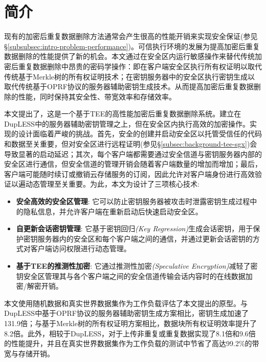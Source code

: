 \section{简介}
\label{sec:sgxdedup-introduction}

现有的加密后重复数据删除方法通常会产生很高的性能开销来实现安全保证(参见\S\ref{subsubsec:intro-problem-performance})。可信执行环境\cite{trustzone,sgx,MK-TME,AMDSEV}的发展为提高加密后重复数据删除的性能提供了新的机会。本文通过在安全区内运行敏感操作来替代传统加密后重复数据删除中昂贵的密码学操作：即在客户端安全区执行所有权证明以取代传统基于Merkle树的所有权证明技术；在密钥服务器中的安全区执行密钥生成以取代传统基于OPRF协议的服务器辅助密钥生成技术。从而提高加密后重复数据删除的性能，同时保持其安全性、带宽效率和存储效率。

本文提出了\sysnameS，这是一个基于TEE的高性能加密后重复数据删除系统。\sysnameS 建立在DupLESS\cite{bellare2013DupLESS}中的服务器辅助密钥管理之上，但在安全区内执行高效的加密操作。实现\sysnameS 的设计面临着严峻的挑战。首先，安全的创建并启动安全区以托管受信任的代码和数据至关重要，但对安全区进行远程证明(参见\S\ref{subsec:background-tee-sgx})会导致显著的启动延迟；其次，每个客户端都需要通过安全信道与密钥服务器内部的安全区进行通信，但安全信道的管理开销会随着客户端数量的增加而增加；最后，客户端可能随时续订或撤销云存储服务的订阅，因此允许对客户端身份进行高效验证以遍动态管理至关重要。为此，本文为\sysnameS 设计了三项核心技术:

\begin{itemize}[leftmargin=0em]
    \item \textbf{安全高效的安全区管理}:
          它可以防止密钥服务器被攻击时泄露密钥生成过程中的隐私信息，并允许客户端在重新启动后快速启动安全区。
    \item \textbf{自更新会话密钥管理}:
          它基于密钥回归\textit{(Key Regression)}\cite{fu06}生成会话密钥，用于保护密钥服务器内的安全区和每个客户端之间的通信，并通过更新会话密钥的方式对客户端访问权限进行动态管理。
    \item \textbf{基于TEE的推测性加密}:
          它通过推测性加密\textit{(Speculative Encryption)}\cite{eduardo2019Speculative}减轻了密钥安全区管理其与各个客户端之间的安全信道传输会话内容时的在线数据加密/解密开销。
\end{itemize}

本文使用随机数据和真实世界数据集\cite{fsl,meyer2011deduplication}作为工作负载评估了本文提出的\sysnameS 原型。与DupLESS\cite{bellare2013DupLESS}中基于OPRF协议的服务器辅助密钥生成方案相比，密钥生成加速了131.9倍；与基于Merkle树的所有权证明方案\cite{halevi11}相比，数据块所有权证明效率提升了8.2倍。此外，相较于DupLESS\cite{bellare2013DupLESS}，\sysnameS 对于上传非重复或重复数据实现了8.1倍和9.6倍的性能提升，并且在真实世界数据集作为工作负载的测试中节省了高达99.2\%的带宽与存储开销。

